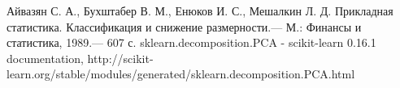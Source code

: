 \begin{thebibliography}{99}
 Айвазян С. А., Бухштабер В. М., Енюков И. С., Мешалкин Л. Д. Прикладная статистика. Классификация и снижение размерности.— М.: Финансы и статистика, 1989.— 607 с.
 sklearn.decomposition.PCA - scikit-learn 0.16.1 documentation, http://scikit-learn.org/stable/modules/generated/sklearn.decomposition.PCA.html
\end{thebibliography}